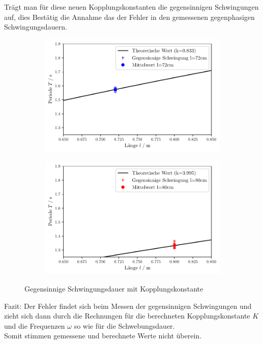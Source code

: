 Trägt man für diese neuen Kopplungskonstanten die gegensinnigen Schwingungen auf, dies Bestätig die Annahme
das der Fehler in den gemessenen gegenphasigen Schwingungsdauern.  
\begin{figure}
    \begin{subfigure}[c]{0.5\textwidth}
        \includegraphics[width=\textwidth]{plots/plot4.pdf}
    \end{subfigure}
    \begin{subfigure}[c]{0.5\textwidth}
        \includegraphics[width=\textwidth]{plots/plot5.pdf}
        \label{subfig:gegenNEU80}
    \end{subfigure}
    \caption{Gegensinnige Schwingungsdauer mit Kopplungskonstante}
\end{figure}

Fazit: Der Fehler findet sich beim Messen der gegensinnigen Schwingungen und
zieht sich dann durch die Rechnungen für die berechneten Kopplungskonstante $K$ und die Frequenzen $\omega$
so wie für die Schwebungsdauer.\\
Somit stimmen gemessene und berechnete Werte nicht überein.


